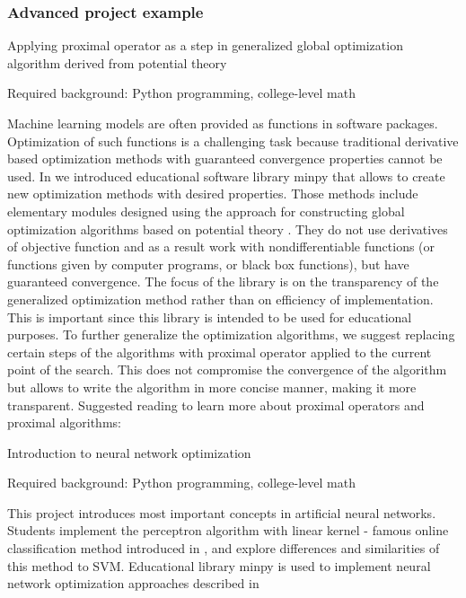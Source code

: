       \subsubsection{Advanced project example \label{advannced project example} }


     Applying proximal operator as a step in generalized global optimization algorithm derived from potential theory




Required background: Python programming, college-level math

Machine learning models are often provided as functions in software packages. Optimization of such functions is a challenging task because traditional derivative based optimization methods with guaranteed convergence properties cannot be used. In \cite{MP} we introduced educational software library minpy that allows to create new optimization methods with desired properties. Those methods include elementary modules designed using the approach for constructing global optimization algorithms based on potential theory \cite{KAP1,KAP2}. They do not use derivatives of objective function and as a result work with nondifferentiable functions (or functions given by computer programs, or black box functions), but have guaranteed convergence. The focus of the library is on the transparency of the generalized optimization method rather than on efficiency of implementation. This is important since this library is intended to be used for educational purposes. To further generalize the optimization algorithms, we suggest replacing certain steps of the algorithms with proximal operator applied to the current point of the search. This does not compromise the convergence of the algorithm  \cite{KAP3}  but allows to write the algorithm in more concise manner, making it more transparent. Suggested reading to learn more about proximal operators and proximal algorithms: \cite{LAKLG,RGMN,SGFLZ}


  Introduction to neural network optimization



Required background: Python programming, college-level math

This project introduces most important concepts in artificial neural networks.
Students implement the perceptron algorithm with linear kernel - famous online classification method introduced in  \cite{ABR}, and explore differences and similarities of this method to SVM. Educational library minpy  \cite{MP} is used to implement neural network optimization approaches described in \cite{YZWQ,YZWQ1,KP1}



